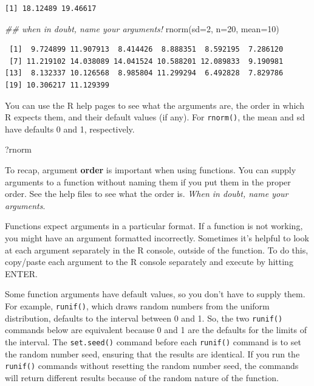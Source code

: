 \documentclass[
  13,
  letterpaper,
]{report}
\newenvironment{Shaded}{\begin{snugshade}}{\end{snugshade}}
\newcommand{\AttributeTok}[1]{\textcolor[rgb]{0.40,0.45,0.13}{#1}}
\newcommand{\DecValTok}[1]{\textcolor[rgb]{0.68,0.00,0.00}{#1}}
\newcommand{\DocumentationTok}[1]{\textcolor[rgb]{0.37,0.37,0.37}{\textit{#1}}}
\newcommand{\FunctionTok}[1]{\textcolor[rgb]{0.28,0.35,0.67}{#1}}
\newcommand{\NormalTok}[1]{\textcolor[rgb]{0.00,0.23,0.31}{#1}}
\begin{document}
\begin{verbatim}
[1] 18.12489 19.46617
\end{verbatim}

\begin{Shaded}
\begin{Highlighting}[]
\DocumentationTok{\#\# when in doubt, name your arguments!}
\FunctionTok{rnorm}\NormalTok{(}\AttributeTok{sd=}\DecValTok{2}\NormalTok{, }\AttributeTok{n=}\DecValTok{20}\NormalTok{, }\AttributeTok{mean=}\DecValTok{10}\NormalTok{)}
\end{Highlighting}
\end{Shaded}

\begin{verbatim}
 [1]  9.724899 11.907913  8.414426  8.888351  8.592195  7.286120
 [7] 11.219102 14.038089 14.041524 10.588201 12.089833  9.190981
[13]  8.132337 10.126568  8.985804 11.299294  6.492828  7.829786
[19] 10.306217 11.129399
\end{verbatim}

You can use the R help pages to see what the arguments are, the order in
which R expects them, and their default values (if any). For
\texttt{rnorm()}, the mean and sd have defaults 0 and 1, respectively.

\begin{Shaded}
\begin{Highlighting}[]
\NormalTok{?rnorm}
\end{Highlighting}
\end{Shaded}

To recap, argument \textbf{order} is important when using functions. You
can supply arguments to a function without naming them if you put them
in the proper order. See the help files to see what the order is.
\emph{When in doubt, name your arguments}.

Functions expect arguments in a particular format. If a function is not
working, you might have an argument formatted incorrectly. Sometimes
it's helpful to look at each argument separately in the R console,
outside of the function. To do this, copy/paste each argument to the R
console separately and execute by hitting ENTER.

Some function arguments have default values, so you don't have to supply
them. For example, \texttt{runif()}, which draws random numbers from the
uniform distribution, defaults to the interval between 0 and 1. So, the
two \texttt{runif()} commands below are equivalent because 0 and 1 are
the defaults for the limits of the interval. The \texttt{set.seed()}
command before each \texttt{runif()} command is to set the random number
seed, ensuring that the results are identical. If you run the
\texttt{runif()} commands without resetting the random number seed, the
commands will return different results because of the random nature of
the function.
\end{document}

